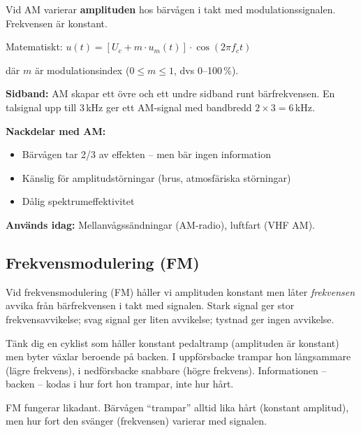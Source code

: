 \documentclass[a4paper,11pt,twoside]{book}
\newcommand{\emoji}[1]{{\emojifont #1}}
\begin{document}
\begin{bluebox}[title={\emoji{🔑} Amplitudmodulering (AM)}]
Vid AM varierar \textbf{amplituden} hos bärvågen i takt med
modulationssignalen. Frekvensen är konstant.

\medskip
Matematiskt: $u(t) = [U_c + m \cdot u_m(t)] \cdot \cos(2\pi f_c t)$

där $m$ är modulationsindex ($0 \leq m \leq 1$, dvs 0--100\,\%).

\medskip
\textbf{Sidband:} AM skapar ett övre och ett undre sidband runt
bärfrekvensen. En talsignal upp till 3\,kHz ger ett AM-signal
med bandbredd $2 \times 3 = 6$\,kHz.

\medskip
\textbf{Nackdelar med AM:}
\begin{itemize}
  \item Bärvågen tar 2/3 av effekten -- men bär ingen information
  \item Känslig för amplitudstörningar (brus, atmosfäriska störningar)
  \item Dålig spektrumeffektivitet
\end{itemize}

\textbf{Används idag:} Mellanvågssändningar (AM-radio), luftfart (VHF AM).
\end{bluebox}

\subsection{Frekvensmodulering (FM)}

Vid frekvensmodulering (FM) håller vi amplituden konstant men
låter \emph{frekvensen} avvika från bärfrekvensen i takt med
signalen. Stark signal ger stor frekvensavvikelse; svag signal
ger liten avvikelse; tystnad ger ingen avvikelse.

\begin{storybox}[{\emoji{🎵} Cykelns växlar}]
Tänk dig en cyklist som håller konstant pedaltramp (amplituden
är konstant) men byter växlar beroende på backen. I uppförsbacke
trampar hon långsammare (lägre frekvens), i nedförsbacke snabbare
(högre frekvens). Informationen -- backen -- kodas i hur fort
hon trampar, inte hur hårt.

FM fungerar likadant. Bärvågen ``trampar'' alltid lika hårt
(konstant amplitud), men hur fort den svänger (frekvensen) varierar
med signalen.
\end{storybox}
\end{document}
